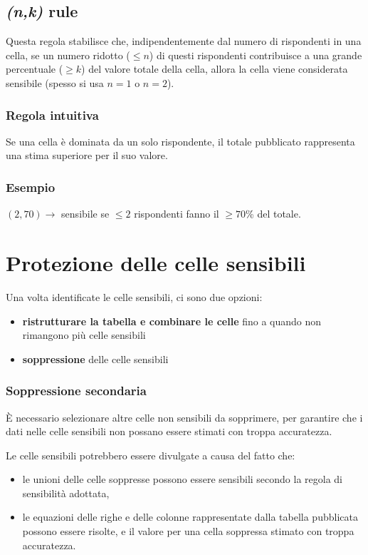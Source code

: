 \documentclass{report}
\begin{document}
\subsection{\textit{(n,k)} rule}
Questa regola stabilisce che, indipendentemente dal numero di rispondenti in una cella, 
se un numero ridotto ($\leq n$) di questi rispondenti contribuisce a una grande percentuale 
($\geq k$) del valore totale della cella, allora la cella viene considerata 
sensibile (spesso si usa $n=1$ o $n=2$).

\subsubsection{Regola intuitiva}
Se una cella è dominata da un solo rispondente, il totale pubblicato rappresenta 
una stima superiore per il suo valore.

\subsubsection{Esempio}
$(2, 70) \rightarrow $ sensibile se $\leq 2$ rispondenti fanno il $\geq 70$\% del totale.


\section{Protezione delle celle sensibili}
Una volta identificate le celle sensibili, ci sono due opzioni:
\begin{itemize}
    \item \textbf{ristrutturare la tabella e combinare le celle} fino a quando non 
    rimangono più celle sensibili
    \item \textbf{soppressione} delle celle sensibili
\end{itemize}

\subsubsection{Soppressione secondaria}
È necessario selezionare altre celle non sensibili da sopprimere, per garantire che i 
dati nelle celle sensibili non possano essere stimati con troppa accuratezza.

\noindent Le celle sensibili potrebbero essere divulgate a causa del fatto che:
\begin{itemize}
    \item le unioni delle celle soppresse possono essere sensibili secondo la regola di sensibilità adottata,
    \item le equazioni delle righe e delle colonne rappresentate dalla tabella pubblicata possono essere risolte, e il valore per una cella soppressa stimato con troppa accuratezza.
\end{itemize}
\end{document}
